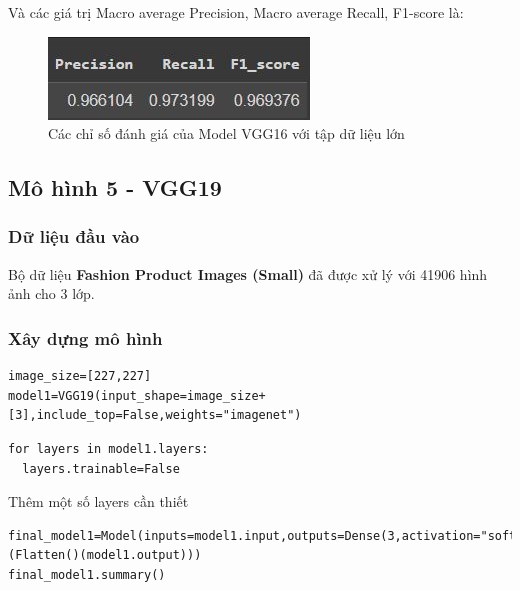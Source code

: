 Và các giá trị Macro average Precision, Macro average Recall, F1-score là:
\begin{center}
    \begin{figure}[!h]
        \centering
        \includegraphics[scale = 1.2]{fileanh/vgg16_increase2.jpg}
        \caption{Các chỉ số đánh giá của Model VGG16 với tập dữ liệu lớn}
    \end{figure}
\end{center}


\subsection{Mô hình 5 - VGG19}
\subsubsection{Dữ liệu đầu vào}
Bộ dữ liệu \textbf{Fashion Product Images (Small)} đã được xử lý với 41906 hình ảnh cho 3 lớp.
\subsubsection{Xây dựng mô hình}
\begin{lstlisting}
image_size=[227,227]
model1=VGG19(input_shape=image_size+[3],include_top=False,weights="imagenet")
\end{lstlisting}
\begin{lstlisting}
for layers in model1.layers:
  layers.trainable=False
\end{lstlisting}
Thêm một số layers cần thiết
\begin{lstlisting}
final_model1=Model(inputs=model1.input,outputs=Dense(3,activation="softmax")(Flatten()(model1.output)))
final_model1.summary()
\end{lstlisting}

